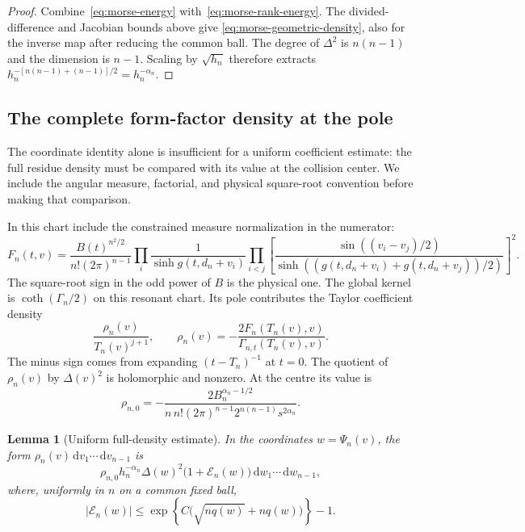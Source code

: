 \documentclass[11pt]{article}
\numberwithin{equation}{section}
\newtheorem{lemma}[theorem]{Lemma}
\theoremstyle{definition}
\newcommand{\dd}{\,\mathrm d}
\begin{document}
\begin{proof}
Combine~\eqref{eq:morse-energy} with~\eqref{eq:morse-rank-energy}.
The divided-difference and Jacobian bounds above give
\eqref{eq:morse-geometric-density}, also for the inverse map after
reducing the common ball.  The degree of $\Delta^2$ is $n(n-1)$ and
the dimension is $n-1$.  Scaling by $\sqrt{h_n}$ therefore extracts
$h_n^{-[n(n-1)+(n-1)]/2}=h_n^{-\alpha_n}$.
\end{proof}

\subsection{The complete form-factor density at the pole}

The coordinate identity alone is insufficient for a uniform coefficient
estimate: the full residue density must be compared with its value at
the collision center. We include the angular measure, factorial, and
physical square-root convention before making that comparison.

In this chart include the constrained measure normalization in the
numerator:
\begin{equation}
 F_n(t,v)=\frac{B(t)^{n^2/2}}{n!(2\pi)^{n-1}}
 \prod_i\frac1{\sinh g(t,d_n+v_i)}
 \prod_{i<j}\left[
 \frac{\sin((v_i-v_j)/2)}
 {\sinh((g(t,d_n+v_i)+g(t,d_n+v_j))/2)}\right]^2.
 \label{eq:morse-complete-numerator}
\end{equation}
The square-root sign in the odd power of $B$ is the physical one.
The global kernel is $\coth(\Gamma_n/2)$ on this resonant chart.
Its pole contributes the Taylor coefficient density
\begin{equation}
 \frac{\rho_n(v)}{T_n(v)^{j+1}},\qquad
 \rho_n(v)=-\frac{2F_n(T_n(v),v)}
 {\Gamma_{n,t}(T_n(v),v)}.
 \label{eq:morse-residue-density}
\end{equation}
The minus sign comes from expanding $(t-T_n)^{-1}$ at $t=0$.
The quotient of $\rho_n(v)$ by $\Delta(v)^2$ is holomorphic and
nonzero.  At the centre its value is
\begin{equation}
 \rho_{n,0}=-\frac{2B_n^{\alpha_n-1/2}}
 {n\,n!(2\pi)^{n-1}2^{n(n-1)}s^{2\alpha_n}}.
 \label{eq:morse-centre-density}
\end{equation}

\begin{lemma}[Uniform full-density estimate]
\label{lem:morse-density}
In the coordinates $w=\Psi_n(v)$, the form
$\rho_n(v)\dd v_1\cdots\dd v_{n-1}$ is
\begin{equation}
 \rho_{n,0}h_n^{-\alpha_n}\Delta(w)^2
 \bigl(1+\mathcal E_n(w)\bigr)
 \dd w_1\cdots\dd w_{n-1},
 \label{eq:morse-transformed-density}
\end{equation}
where, uniformly in $n$ on a common fixed ball,
\begin{equation}
 |\mathcal E_n(w)|\le
 \exp\!\left\{C\bigl(\sqrt{nq(w)}+nq(w)\bigr)\right\}-1.
 \label{eq:morse-density-error}
\end{equation}
\end{lemma}
\end{document}
